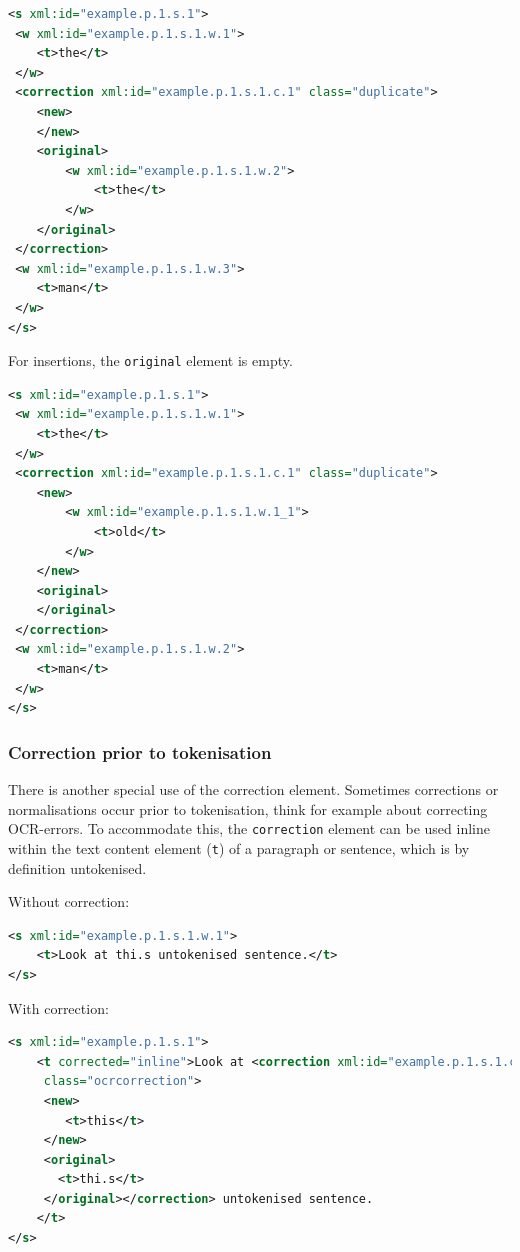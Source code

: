 \documentclass[a4paper,12pt]{report}
\begin{document}
\begin{lstlisting}[language=xml]
<s xml:id="example.p.1.s.1">
 <w xml:id="example.p.1.s.1.w.1">
    <t>the</t>
 </w>
 <correction xml:id="example.p.1.s.1.c.1" class="duplicate">
    <new>                        
    </new>
    <original>
        <w xml:id="example.p.1.s.1.w.2">
            <t>the</t>
        </w>
    </original>
 </correction>  
 <w xml:id="example.p.1.s.1.w.3">
    <t>man</t>
 </w>
</s>
\end{lstlisting}

For insertions, the \texttt{original} element is empty. 

\begin{lstlisting}[language=xml]
<s xml:id="example.p.1.s.1">
 <w xml:id="example.p.1.s.1.w.1">
    <t>the</t>
 </w>
 <correction xml:id="example.p.1.s.1.c.1" class="duplicate">
    <new>                            
        <w xml:id="example.p.1.s.1.w.1_1">
            <t>old</t>
        </w>
    </new>
    <original>
    </original>
 </correction>  
 <w xml:id="example.p.1.s.1.w.2">
    <t>man</t>
 </w>
</s>
\end{lstlisting}


\subsubsection{Correction prior to tokenisation} 
\label{sec:pretokcorrection}

There is another special use of the correction element. Sometimes corrections or normalisations occur prior to tokenisation, think for example about correcting OCR-errors. To accommodate this, the \texttt{correction} element can be used inline within the text content element (\texttt{t}) of a paragraph or sentence, which is by definition untokenised.

Without correction:

\begin{lstlisting}[language=xml]
<s xml:id="example.p.1.s.1.w.1">
    <t>Look at thi.s untokenised sentence.</t>
</s>            
\end{lstlisting}

With correction:

\begin{lstlisting}[language=xml]
<s xml:id="example.p.1.s.1">
    <t corrected="inline">Look at <correction xml:id="example.p.1.s.1.c.1"
     class="ocrcorrection">
     <new>
        <t>this</t>
     </new>
     <original>
       <t>thi.s</t>
     </original></correction> untokenised sentence.
    </t>
</s>                         
\end{lstlisting}
\end{document}
